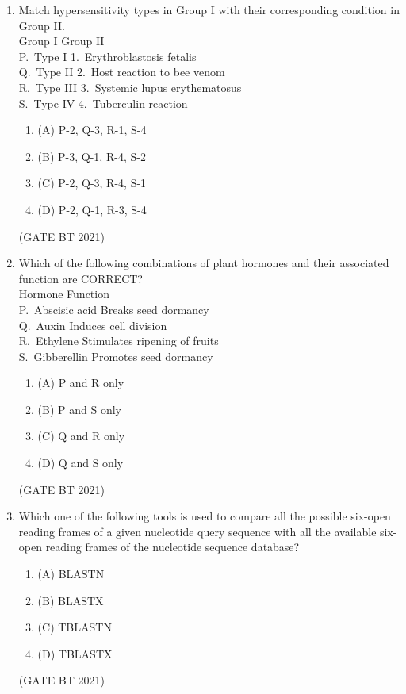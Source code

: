 \documentclass[journal,12pt,onecolumn]{IEEEtran}
\theoremstyle{remark}
\begin{document}
\begin{enumerate}
\item Match hypersensitivity types in Group I with their corresponding condition in Group II.\\[2pt]
Group I \hspace{3.5cm} Group II\\
P.\ Type I \hspace{3.7cm} 1.\ Erythroblastosis fetalis\\
Q.\ Type II \hspace{3.5cm} 2.\ Host reaction to bee venom\\
R.\ Type III \hspace{3.2cm} 3.\ Systemic lupus erythematosus\\
S.\ Type IV \hspace{3.3cm} 4.\ Tuberculin reaction
\begin{enumerate}
\item (A) P-2, Q-3, R-1, S-4
\item (B) P-3, Q-1, R-4, S-2
\item (C) P-2, Q-3, R-4, S-1
\item (D) P-2, Q-1, R-3, S-4
\end{enumerate}
\hfill (GATE BT 2021)

\item Which of the following combinations of plant hormones and their associated function are CORRECT?\\[2pt]
Hormone \hspace{3.5cm} Function\\
P.\ Abscisic acid \hspace{2.6cm} Breaks seed dormancy\\
Q.\ Auxin \hspace{3.7cm} Induces cell division\\
R.\ Ethylene \hspace{3.3cm} Stimulates ripening of fruits\\
S.\ Gibberellin \hspace{3.1cm} Promotes seed dormancy
\begin{enumerate}
\item (A) P and R only
\item (B) P and S only
\item (C) Q and R only
\item (D) Q and S only
\end{enumerate}
\hfill (GATE BT 2021)

\item Which one of the following tools is used to compare all the possible six-open reading frames of a given nucleotide query sequence with all the available six-open reading frames of the nucleotide sequence database?
\begin{enumerate}
\item (A) BLASTN
\item (B) BLASTX
\item (C) TBLASTN
\item (D) TBLASTX
\end{enumerate}
\hfill (GATE BT 2021)


\end{enumerate}
\end{document}
